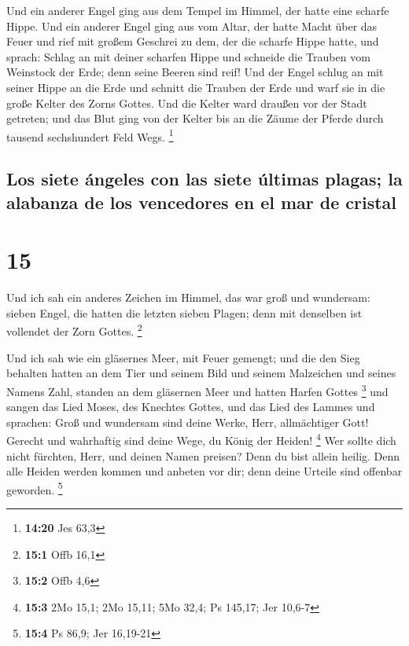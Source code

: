  Und ein anderer Engel ging aus dem Tempel im Himmel, der
hatte eine scharfe Hippe.  Und ein anderer Engel ging aus
vom Altar, der hatte Macht über das Feuer und rief mit großem Geschrei
zu dem, der die scharfe Hippe hatte, und sprach: Schlag an mit deiner
scharfen Hippe und schneide die Trauben vom Weinstock der Erde; denn
seine Beeren sind reif!  Und der Engel schlug an mit
seiner Hippe an die Erde und schnitt die Trauben der Erde und warf sie
in die große Kelter des Zorns Gottes.  Und die Kelter
ward draußen vor der Stadt getreten; und das Blut ging von der Kelter
bis an die Zäume der Pferde durch tausend sechshundert Feld Wegs.
\footnote{\textbf{14:20} Jes 63,3}

\hypertarget{los-siete-uxe1ngeles-con-las-siete-uxfaltimas-plagas-la-alabanza-de-los-vencedores-en-el-mar-de-cristal}{%
\subsection{Los siete ángeles con las siete últimas plagas; la alabanza
de los vencedores en el mar de
cristal}\label{los-siete-uxe1ngeles-con-las-siete-uxfaltimas-plagas-la-alabanza-de-los-vencedores-en-el-mar-de-cristal}}

\hypertarget{section-14}{%
\section{15}\label{section-14}}

 Und ich sah ein anderes Zeichen im Himmel, das war groß
und wundersam: sieben Engel, die hatten die letzten sieben Plagen; denn
mit denselben ist vollendet der Zorn Gottes. \footnote{\textbf{15:1}
  Offb 16,1}

 Und ich sah wie ein gläsernes Meer, mit Feuer gemengt;
und die den Sieg behalten hatten an dem Tier und seinem Bild und seinem
Malzeichen und seines Namens Zahl, standen an dem gläsernen Meer und
hatten Harfen Gottes \footnote{\textbf{15:2} Offb 4,6} 
und sangen das Lied Moses, des Knechtes Gottes, und das Lied des Lammes
und sprachen: Groß und wundersam sind deine Werke, Herr, allmächtiger
Gott! Gerecht und wahrhaftig sind deine Wege, du König der Heiden!
\footnote{\textbf{15:3} 2Mo 15,1; 2Mo 15,11; 5Mo 32,4; Ps 145,17; Jer
  10,6-7}  Wer sollte dich nicht fürchten, Herr, und
deinen Namen preisen? Denn du bist allein heilig. Denn alle Heiden
werden kommen und anbeten vor dir; denn deine Urteile sind offenbar
geworden. \footnote{\textbf{15:4} Ps 86,9; Jer 16,19-21}

